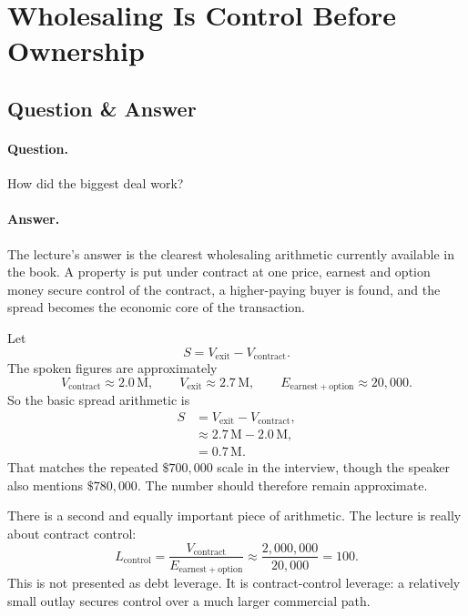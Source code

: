 \documentclass[11pt,oneside]{book}
\begin{document}
\section{Wholesaling Is Control Before Ownership}

\subsection{Question \& Answer}

\paragraph{Question.}
How did the biggest deal work?

\paragraph{Answer.}
The lecture's answer is the clearest wholesaling arithmetic currently available in the book. A property is put under contract at one price, earnest and option money secure control of the contract, a higher-paying buyer is found, and the spread becomes the economic core of the transaction.

Let
\begin{equation}
S = V_{\mathrm{exit}} - V_{\mathrm{contract}}.
\end{equation}
The spoken figures are approximately
\begin{equation}
V_{\mathrm{contract}} \approx 2.0\,\mathrm{M},
\qquad
V_{\mathrm{exit}} \approx 2.7\,\mathrm{M},
\qquad
E_{\mathrm{earnest+option}} \approx 20{,}000.
\end{equation}
So the basic spread arithmetic is
\begin{align}
S &= V_{\mathrm{exit}} - V_{\mathrm{contract}},\\
&\approx 2.7\,\mathrm{M} - 2.0\,\mathrm{M},\\
&= 0.7\,\mathrm{M}.
\end{align}
That matches the repeated \(\$700{,}000\) scale in the interview, though the speaker also mentions \(\$780{,}000\). The number should therefore remain approximate.

There is a second and equally important piece of arithmetic. The lecture is really about contract control:
\begin{equation}
L_{\mathrm{control}}
=
\frac{V_{\mathrm{contract}}}{E_{\mathrm{earnest+option}}}
\approx
\frac{2{,}000{,}000}{20{,}000}
=100.
\end{equation}
This is not presented as debt leverage. It is contract-control leverage: a relatively small outlay secures control over a much larger commercial path.
\end{document}
